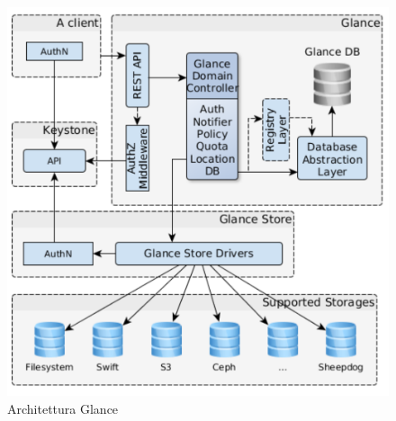 \documentclass{article}
\begin{document}
\begin{figure}[H]
    \centering
    \includegraphics[scale=0.3]{img/glance architecture.png}
    \caption{Architettura Glance}
\end{figure}\noindent
\end{document}
